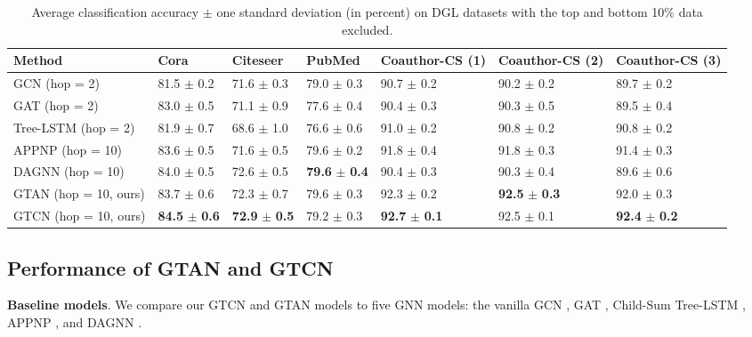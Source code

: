 \documentclass[lettersize,journal]{IEEEtran}
\theoremstyle{plain}
\theoremstyle{definition}
\theoremstyle{remark}
\begin{document}
\begin{table*}[t]
	\caption{Average classification accuracy $\pm$ one standard deviation (in percent) on DGL datasets with the top and bottom 10\% data excluded.}
	\label{tb:result1}
	\begin{center}
		\begin{tabularx}{0.9\textwidth}{p{3.5cm} p{1.5cm} p{1.5cm} p{1.5cm} p{1.5cm} p{1.5cm} p{1.5cm}}
			\toprule
			\textbf{Method}  &\textbf{Cora} &\textbf{Citeseer}
			&\textbf{PubMed} &\textbf{Coauthor-CS (1)}
			&\textbf{Coauthor-CS (2)}
			&\textbf{Coauthor-CS (3)} \\
			\midrule
			GCN (hop = 2)  &81.5 $\pm$ 0.2 &71.6 $\pm$ 0.3 &79.0 $\pm$ 0.3 &90.7 $\pm$ 0.2 &90.2 $\pm$ 0.2 &89.7 $\pm$ 0.2\\
			GAT (hop = 2) &83.0 $\pm$ 0.5 &71.1 $\pm$ 0.9 &77.6 $\pm$ 0.4 &90.4 $\pm$ 0.3 &90.3 $\pm$ 0.5 &89.5 $\pm$ 0.4\\
			Tree-LSTM (hop = 2) &81.9 $\pm$ 0.7 &68.6 $\pm$ 1.0 &76.6 $\pm$ 0.6 &91.0 $\pm$ 0.2 &90.8 $\pm$ 0.2 &90.8 $\pm$ 0.2\\
			APPNP (hop = 10) &83.6 $\pm$ 0.5 &71.6 $\pm$ 0.5 &79.6 $\pm$ 0.2 &91.8 $\pm$ 0.4 &91.8 $\pm$ 0.3 &91.4 $\pm$ 0.3\\
			DAGNN (hop = 10) &84.0 $\pm$ 0.5 &72.6 $\pm$ 0.5 &\textbf{79.6} $\pm$ \textbf{0.4} &90.4 $\pm$ 0.3 &90.3 $\pm$ 0.4 &89.6 $\pm$ 0.6\\
\midrule
			GTAN (hop = 10, ours) &83.7 $\pm$ 0.6 &72.3 $\pm$ 0.7 &79.6 $\pm$ 0.3 &92.3 $\pm$ 0.2 &\textbf{92.5} $\pm$ \textbf{0.3} &92.0 $\pm$ 0.3\\
			GTCN (hop = 10, ours) &\textbf{84.5} $\pm$ \textbf{0.6} &\textbf{72.9} $\pm$ \textbf{0.5} &79.2 $\pm$ 0.3 &\textbf{92.7} $\pm$ \textbf{0.1} &92.5 $\pm$ 0.1 &\textbf{92.4} $\pm$ \textbf{0.2}\\
			\bottomrule
		\end{tabularx}
	\end{center}
\end{table*}

\subsection{Performance of GTAN and GTCN}
\label{exp_GTC_GTAN}

\textbf{Baseline models}. We compare our GTCN and GTAN models to five GNN models: the vanilla GCN \citep{DBLP:conf/iclr/KipfW17}, GAT \citep{DBLP:conf/iclr/VelickovicCCRLB18}, Child-Sum Tree-LSTM \citep{tai2015improved}, APPNP \citep{klicpera2018predict}, and DAGNN \citep{liu2020towards}.
\end{document}
